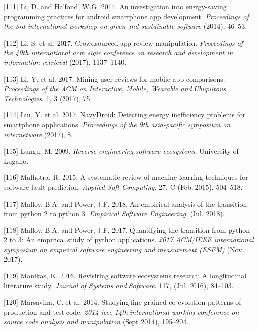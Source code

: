 \documentclass[]{book}
\begin{document}
\hypertarget{ref-LH2014}{}
{[}111{]} Li, D. and Halfond, W.G. 2014. An investigation into
energy-saving programming practices for android smartphone app
development. \emph{Proceedings of the 3rd international workshop on
green and sustainable software} (2014), 46--53.

\hypertarget{ref-i2017crowdsourced}{}
{[}112{]} Li, S. et al. 2017. Crowdsourced app review manipulation.
\emph{Proceedings of the 40th international acm sigir conference on
research and development in information retrieval} (2017), 1137--1140.

\hypertarget{ref-li2017mining}{}
{[}113{]} Li, Y. et al. 2017. Mining user reviews for mobile app
comparisons. \emph{Proceedings of the ACM on Interactive, Mobile,
Wearable and Ubiquitous Technologies}. 1, 3 (2017), 75.

\hypertarget{ref-LWXM2017}{}
{[}114{]} Liu, Y. et al. 2017. NavyDroid: Detecting energy inefficiency
problems for smartphone applications. \emph{Proceedings of the 9th
asia-pacific symposium on internetware} (2017), 8.

\hypertarget{ref-Lungu2009}{}
{[}115{]} Lungu, M. 2009. \emph{Reverse engineering software
ecosystems}. University of Lugano.

\hypertarget{ref-Malhotra2015}{}
{[}116{]} Malhotra, R. 2015. A systematic review of machine learning
techniques for software fault prediction. \emph{Applied Soft Computing}.
27, C (Feb. 2015), 504--518.

\hypertarget{ref-Malloy2018}{}
{[}117{]} Malloy, B.A. and Power, J.F. 2018. An empirical analysis of
the transition from python 2 to python 3. \emph{Empirical Software
Engineering}. (Jul. 2018).

\hypertarget{ref-Malloy2017}{}
{[}118{]} Malloy, B.A. and Power, J.F. 2017. Quantifying the transition
from python 2 to 3: An empirical study of python applications.
\emph{2017 ACM/IEEE international symposium on empirical software
engineering and measurement (ESEM)} (Nov. 2017).

\hypertarget{ref-Manikas2016}{}
{[}119{]} Manikas, K. 2016. Revisiting software ecosystems research: A
longitudinal literature study. \emph{Journal of Systems and Software}.
117, (Jul. 2016), 84--103.

\hypertarget{ref-marsavina2014}{}
{[}120{]} Marsavina, C. et al. 2014. Studying fine-grained co-evolution
patterns of production and test code. \emph{2014 ieee 14th international
working conference on source code analysis and manipulation} (Sept
2014), 195--204.
\end{document}
